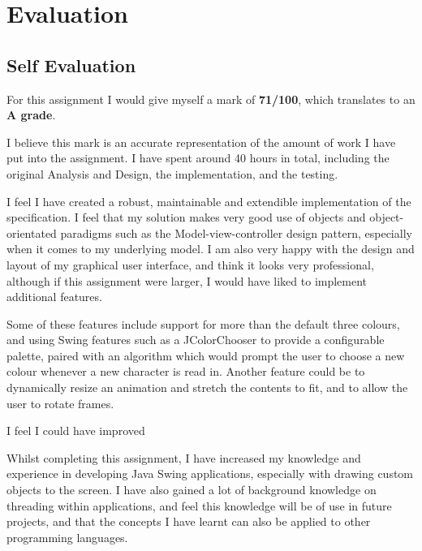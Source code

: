 \documentclass[a4paper, 11pt]{article}
\begin{document}
\newpage

\section{Evaluation}

\subsection{Self Evaluation}

For this assignment I would give myself a mark of \textbf{71/100}, which translates to an \textbf{A grade}.

I believe this mark is an accurate representation of the amount of work I have put into the assignment. I have spent around 40 hours in total, including the original Analysis and Design, the implementation, and the testing.

I feel I have created a robust, maintainable and extendible implementation of the specification. I feel that my solution makes very good use of objects and object-orientated paradigms such as the Model-view-controller design pattern, especially when it comes to my underlying model. I am also very happy with the design and layout of my graphical user interface, and think it looks very professional, although if this assignment were larger, I would have liked to implement additional features.

Some of these features include support for more than the default three colours, and using Swing features such as a JColorChooser to provide a configurable palette, paired with an algorithm which would prompt the user to choose a new colour whenever a new character is read in. Another feature could be to dynamically resize an animation and stretch the contents to fit, and to allow the user to rotate frames.

I feel I could have improved 

\vspace{\baselineskip}

Whilst completing this assignment, I have increased my knowledge and experience in developing Java Swing applications, especially with drawing custom objects to the screen. I have also gained a lot of background knowledge on threading within applications, and feel this knowledge will be of use in future projects, and that the concepts I have learnt can also be applied to other programming languages.

\newpage
\end{document}

